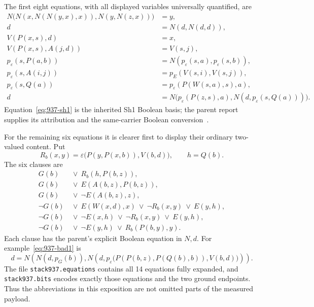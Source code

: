The first eight equations, with all displayed variables universally
quantified, are
\begin{align}
 N\bigl(N(x,N(N(y,x),x)),N(y,N(z,x))\bigr)&=y,
       \label{eq:937-sh1}\\
 d&=N(d,N(d,d)),\label{eq:937-top}\\
 V(P(x,s),d)&=x,\label{eq:937-head}\\
 V(P(x,s),A(j,d))&=V(s,j),\label{eq:937-tail}\\
 p_\varepsilon(s,P(a,b))
       &=N(p_\varepsilon(s,a),p_\varepsilon(s,b)),\\
 p_\varepsilon(s,A(i,j))
       &=p_E(V(s,i),V(s,j)),\\
 p_\varepsilon(s,Q(a))
       &=p_\varepsilon(P(W(s,a),s),a),\label{eq:937-witness}\\
 d&=N\bigl(p_\varepsilon(P(z,s),a),
                N(d,p_\varepsilon(s,Q(a)))\bigr).
                \label{eq:937-arbitrary}
\end{align}
Equation~\eqref{eq:937-sh1} is the inherited Sh1 Boolean basis;
the parent report supplies its attribution and the same-carrier
Boolean conversion~\cite{coordinated239}.

For the remaining six equations it is clearer first to display their
ordinary two-valued content.  Put
\[
 R_b(x,y)=
 \varepsilon\bigl(P(y,P(x,b)),V(b,d)\bigr),\qquad h=Q(b).
\]
The six clauses are
\begin{align}
 G(b)&\ \lor\ R_b(h,P(b,z)), \label{eq:937-bad1}\\
 G(b)&\ \lor\ E(A(b,z),P(b,z)), \label{eq:937-bad2}\\
 G(b)&\ \lor\ \neg E(A(b,z),z), \label{eq:937-bad3}\\
 \neg G(b)&\ \lor\ E(W(x,d),x)\ \lor\
                    \neg R_b(x,y)\ \lor\ E(y,h), \label{eq:937-empty}\\
 \neg G(b)&\ \lor\ \neg E(x,h)\ \lor\
                    \neg R_b(x,y)\ \lor\ E(y,h), \label{eq:937-close}\\
 \neg G(b)&\ \lor\ \neg E(y,h)\ \lor\
                    R_b(P(b,y),y). \label{eq:937-support}
\end{align}
Each clause has the parent's explicit Boolean equation in \(N,d\).
For example~\eqref{eq:937-bad1} is
\[
 d=N\!\left(N(d,p_G(b)),
 N\!\left(d,p_\varepsilon
       \bigl(P(P(b,z),P(Q(b),b)),V(b,d)\bigr)\right)\right).
\]
The file \texttt{stack937.equations} contains all 14 equations fully
expanded, and \texttt{stack937.bits} encodes exactly those equations and
the two ground endpoints.  Thus the abbreviations in this exposition
are not omitted parts of the measured payload.

